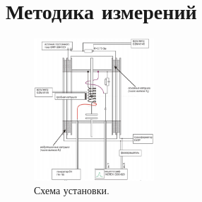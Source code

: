 \documentclass[a4paper, 12pt]{article}
\begin{document}
\newpage

\section{Методика измерений}

\begin{figure}
\includegraphics[width = 0.4\textwidth]{ust.png}
\centering
\caption{Схема установки.}
\end{figure}
\end{document}

